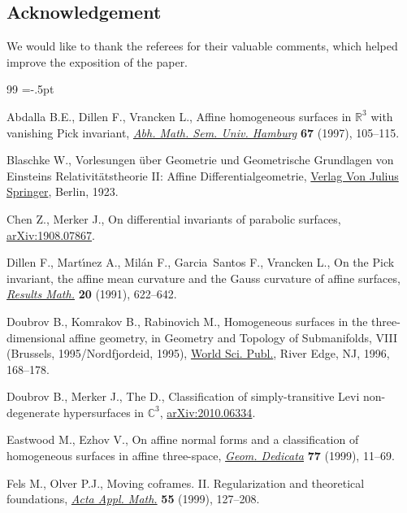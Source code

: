 \documentclass[pdftex]{sigma}%
\numberwithin{equation}{section}
\begin{document}
\subsection*{Acknowledgement}

We would like to thank the referees for their valuable comments, which helped improve the exposition of the paper.

\begin{thebibliography}{99}
\footnotesize\itemsep=-.5pt

Abdalla B.E., Dillen F., Vrancken L., Affine homogeneous surfaces in {${\mathbb
 R}^3$} with vanishing {P}ick invariant, \href{https://doi.org/10.1007/BF02940821}{\textit{Abh. Math. Sem. Univ.
 Hamburg}} \textbf{67} (1997), 105--115.

Blaschke W., Vorlesungen \"uber {G}eometrie und {G}eometrische {G}rundlagen von
 {E}insteins {R}elativit\"atstheorie {II}: {A}ffine {D}ifferentialgeometrie,
 \href{https://doi.org/10.1007/978-3-642-47392-0}{Verlag Von Julius Springer}, Berlin, 1923.

Chen Z., Merker J., On differential invariants of parabolic surfaces,
 \href{https://arxiv.org/abs/1908.07867}{arXiv:1908.07867}.

Dillen F., Mart\'{\i}nez A., Mil\'an F., Garcia~Santos F., Vrancken L., On the
 {P}ick invariant, the affine mean curvature and the {G}auss curvature of
 affine surfaces, \href{https://doi.org/10.1007/BF03323199}{\textit{Results Math.}} \textbf{20} (1991), 622--642.

Doubrov B., Komrakov B., Rabinovich M., Homogeneous surfaces in the
 three-dimensional affine geometry, in Geometry and Topology of Submanifolds,
 {VIII} ({B}russels, 1995/{N}ordfjordeid, 1995), \href{https://doi.org/10.1142/9789814530873}{World Sci. Publ.}, River Edge,
 NJ, 1996, 168--178.

Doubrov B., Merker J., The D., Classification of simply-transitive Levi
 non-degenerate hypersurfaces in $\mathbb{C}^3$, \href{https://arxiv.org/abs/2010.06334}{arXiv:2010.06334}.

Eastwood M., Ezhov V., On affine normal forms and a classification of
 homogeneous surfaces in affine three-space, \href{https://doi.org/10.1023/A:1005083518793}{\textit{Geom. Dedicata}}
 \textbf{77} (1999), 11--69.

Fels M., Olver P.J., Moving coframes. {II}. {R}egularization and theoretical
 foundations, \href{https://doi.org/10.1023/A:1006195823000}{\textit{Acta Appl. Math.}} \textbf{55} (1999), 127--208.


\end{thebibliography}
\end{document}
